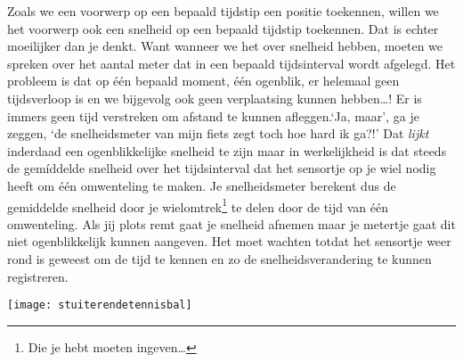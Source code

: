 \documentclass{ximera}
\begin{document}
	Zoals we een voorwerp op een bepaald tijdstip een positie toekennen, willen we het voorwerp ook een snelheid op een bepaald tijdstip toekennen. Dat is echter moeilijker dan je denkt. Want wanneer we het over snelheid hebben, moeten we spreken over het aantal meter dat in een bepaald tijds\-in\-ter\-val wordt afgelegd. Het probleem is dat op \'e\'en bepaald moment, \'e\'en ogenblik, er helemaal geen tijdsverloop is en we bijgevolg ook geen verplaatsing kunnen hebben\ldots! Er is immers geen tijd verstreken om afstand te kunnen afleggen.`Ja, maar', ga je zeggen, `de snelheidsmeter van mijn fiets zegt toch hoe hard ik ga?!' Dat \emph{lijkt} inderdaad een ogenblikkelijke snelheid te zijn maar in werkelijkheid is dat steeds de gem\'iddelde snelheid over het \mbox{tijds}\-in\-ter\-val dat het sensortje op je wiel nodig heeft om \'e\'en omwenteling te maken. Je snelheidsmeter berekent dus de gemiddelde snelheid door je wielomtrek\footnote{Die je hebt moeten ingeven\ldots} te delen door de tijd van \'e\'en omwenteling. Als jij plots remt gaat je snelheid afnemen maar je metertje gaat dit niet ogenblikkelijk kunnen aangeven. Het moet wachten totdat het sensortje weer rond is geweest om de tijd te kennen en zo de snelheidsverandering te kunnen registreren.
	\begin{image}
	
	\texttt{[image: stuiterendetennisbal]}
	\end{image}
	
\end{document}
